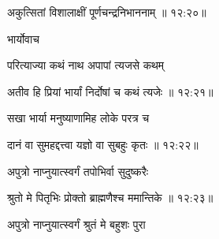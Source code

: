 
{\devanagarifont अकुत्सितां विशालाक्षीं पूर्णचन्द्रनिभाननाम् {॥ १२:२०॥} \veg\dontdisplaylinenum }%

{\devanagarifont भार्योवाच {\dandab}\dontdisplaylinenum  }%
 
{\devanagarifont परित्याज्या कथं नाथ अपापां त्यजसे कथम् \thinspace{\danda} \dontdisplaylinenum }%


{\devanagarifont अतीव हि प्रियां भार्यां निर्दोषां च कथं त्यजेः {॥ १२:२१॥} \veg\dontdisplaylinenum }%

{\devanagarifont सखा भार्या मनुष्याणामिह लोके परत्र च \thinspace{\dandab} \dontdisplaylinenum }%


{\devanagarifont दानं वा सुमहद्दत्त्वा यज्ञो वा सुबहुः कृतः {॥ १२:२२॥} \veg\dontdisplaylinenum }%

{\devanagarifont अपुत्रो नाप्नुयात्स्वर्गं तपोभिर्वा सुदुष्करैः \thinspace{\dandab} \dontdisplaylinenum }%


{\devanagarifont श्रुतो मे पितृभिः प्रोक्तो ब्राह्मणैश्च ममान्तिके {॥ १२:२३॥} \veg\dontdisplaylinenum }%

{\devanagarifont अपुत्रो नाप्नुयात्स्वर्गं श्रुतं मे बहुशः पुरा \thinspace{\dandab} \dontdisplaylinenum }%

